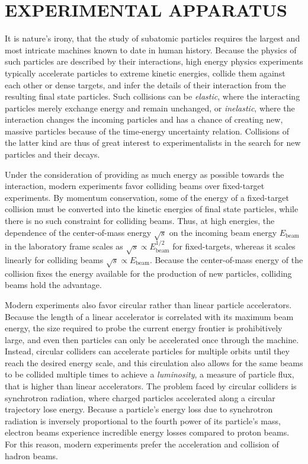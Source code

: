 \chapter{EXPERIMENTAL APPARATUS} \label{experiment}

It is nature's irony, that the study of subatomic particles requires the largest and most intricate machines known to date in human history. Because the physics of such particles are described by their interactions, high energy physics experiments typically accelerate particles to extreme kinetic energies, collide them against each other or dense targets, and infer the details of their interaction from the resulting final state particles. Such collisions can be \textit{elastic}, where the interacting particles merely exchange energy and remain unchanged, or \textit{inelastic}, where the interaction changes the incoming particles and has a chance of creating new, massive particles because of the time-energy uncertainty relation. Collisions of the latter kind are thus of great interest to experimentalists in the search for new particles and their decays.

Under the consideration of providing as much energy as possible towards the interaction, modern experiments favor colliding beams over fixed-target experiments. By momentum conservation, some of the energy of a fixed-target collision must be converted into the kinetic energies of final state particles, while there is no such constraint for colliding beams. Thus, at high energies, the dependence of the center-of-mass energy $\sqrt{s}$ on the incoming beam energy $E_{\textrm{beam}}$ in the laboratory frame scales as $\sqrt{s} \propto E_{\textrm{beam}}^{1/2}$ for fixed-targets, whereas it scales linearly for colliding beams $\sqrt{s} \propto E_{\textrm{beam}}$. Because the center-of-mass energy of the collision fixes the energy available for the production of new particles, colliding beams hold the advantage.

Modern experiments also favor circular rather than linear particle accelerators. Because the length of a linear accelerator is correlated with its maximum beam energy, the size required to probe the current energy frontier is prohibitively large, and even then particles can only be accelerated once through the machine. Instead, circular colliders can accelerate particles for multiple orbits until they reach the desired energy scale, and this circulation also allows for the same beams to be collided multiple times to achieve a \textit{luminosity}, a measure of particle flux, that is higher than linear accelerators. The problem faced by circular colliders is synchrotron radiation, where charged particles accelerated along a circular trajectory lose energy. Because a particle's energy loss due to synchrotron radiation is inversely proportional to the fourth power of its particle's mass, electron beams experience incredible energy losses compared to proton beams. For this reason, modern experiments prefer the acceleration and collision of hadron beams.

